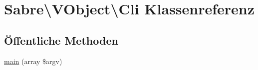 \hypertarget{class_sabre_1_1_v_object_1_1_cli}{}\section{Sabre\textbackslash{}V\+Object\textbackslash{}Cli Klassenreferenz}
\label{class_sabre_1_1_v_object_1_1_cli}
\subsection*{Öffentliche Methoden}
\begin{DoxyCompactItemize}
\item 
\mbox{\hyperlink{class_sabre_1_1_v_object_1_1_cli_a5e13b470e33895afb366b1373d5365c2}{main}} (array \$argv)
\end{DoxyCompactItemize}
